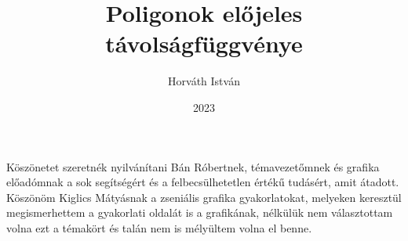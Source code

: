 \documentclass[
]{thesis}[2022/04/30]
\title{Poligonok előjeles távolságfüggvénye} %
\date{2023} %
\author{Horváth István}
\affiliation{MSc, doktorandusz} %
\begin{document}


\maketitle
%

\tableofcontents
\cleardoublepage


\cleardoublepage


\cleardoublepage


\cleardoublepage


\cleardoublepage

\chapter*{\acklabel}
Köszönetet szeretnék nyilvánítani Bán Róbertnek, témavezetőmnek és grafika előadómnak a sok segítségért és a felbecsülhetetlen értékű tudásért, amit átadott. Köszönöm Kiglics Mátyásnak a zseniális grafika gyakorlatokat, melyeken keresztül megismerhettem a gyakorlati oldalát is a grafikának, nélkülük nem választottam volna ezt a témakört és talán nem is mélyültem volna el benne.

{}
\printbibliography[title=\biblabel]
\cleardoublepage

{}
\listoffigures
\cleardoublepage

{}
\lstlistoflistings
\cleardoublepage

\end{document}
